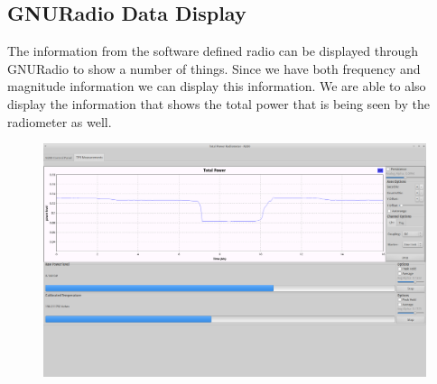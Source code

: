 


\subsection{GNURadio Data Display}
The information from the software defined radio can be displayed through GNURadio to show a number of things.  Since we have both frequency and magnitude information we can display this information.  We are able to also display the information that shows the total power that is being seen by the radiometer as well.

{\begin{figure}[h!tb] 
\centering
\includegraphics[width=17cm]{Images/Lab1_TPR_at_end_exp.png}
\label{radiometer_tpr_display}
\end{figure}
}

